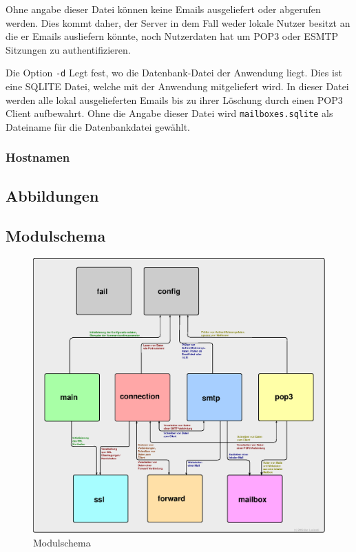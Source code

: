 \documentclass[final,a4paper,11pt,notitlepage,halfparskip]{scrreprt}
\begin{document}
Ohne angabe dieser Datei können keine Emails ausgeliefert oder abgerufen werden.
Dies kommt daher, der Server in dem Fall weder lokale Nutzer besitzt an die er
Emails ausliefern könnte, noch Nutzerdaten hat um POP3 oder ESMTP Sitzungen zu
authentifizieren.

Die Option \texttt{-d} Legt fest, wo die Datenbank-Datei der Anwendung liegt.
Dies ist eine SQLITE Datei, welche mit der Anwendung mitgeliefert wird. In
dieser Datei werden alle lokal ausgelieferten Emails bis zu ihrer Löschung durch
einen POP3 Client aufbewahrt. Ohne die Angabe dieser Datei wird
\texttt{mailboxes.sqlite} als Dateiname für die Datenbankdatei gewählt.


\subsection{Hostnamen}



\pagebreak

\begin{appendix}
  \chapter{Abbildungen}
  \section{Modulschema}
  \begin{figure}[htb]
    \includegraphics[width=\textwidth]{schema.eps}
    \caption{Modulschema}
    \label{fig:schema}
  \end{figure}
\end{appendix}
\end{document}
